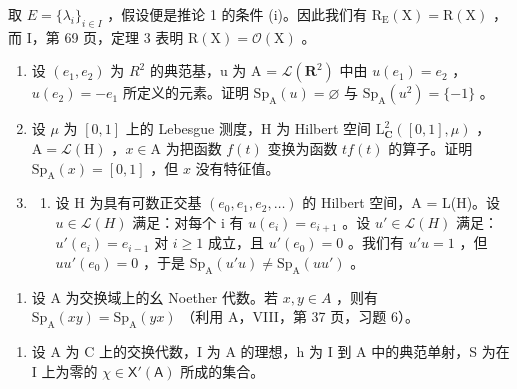 取 \(E = \{\lambda_{i}\}_{i \in I}\) ，假设便是推论 1 的条件 (i)。因此我们有 \(\mathrm{R}_{\mathrm{E}}(\mathrm{X}) = \mathrm{R}(\mathrm{X})\) ，而 I，第 69 页，定理 3 表明 \(\mathrm{R}(\mathrm{X}) = \mathcal{O}(\mathrm{X})\) 。



\begin{enumerate}
\def\labelenumi{\arabic{enumi})}
\item
  设 \((e_{1}, e_{2})\) 为 \(R^{2}\) 的典范基，u 为 A = \(\mathcal{L}(\mathbf{R}^{2})\) 中由 \(u(e_{1}) = e_{2}\) ，\(u(e_{2}) = -e_{1}\) 所定义的元素。证明 \(\mathrm{Sp}_{\mathrm{A}}(u) = \varnothing\) 与 \(\mathrm{Sp}_{\mathrm{A}}(u^{2}) = \{-1\}\) 。
\item
  设 \(\mu\) 为 \([0,1]\) 上的 Lebesgue 测度，H 为 Hilbert 空间 \(\mathrm{L}_{\mathbf{C}}^{2}([0,1],\mu)\) ，\(\mathrm{A} = \mathcal{L}(\mathrm{H})\) ，\(x \in \mathrm{A}\) 为把函数 \(f(t)\) 变换为函数 \(tf(t)\) 的算子。证明 \(\mathrm{Sp}_{\mathrm{A}}(x) = [0,1]\) ，但 \(x\) 没有特征值。
\item
  \begin{enumerate}
  \def\labelenumii{\alph{enumii})}
  \tightlist
  \item
    设 H 为具有可数正交基 \((e_{0}, e_{1}, e_{2}, \ldots)\) 的 Hilbert 空间，A = L(H)。设 \(u \in \mathcal{L}(H)\) 满足：对每个 i 有 \(u(e_{i}) = e_{i+1}\) 。设 \(u' \in \mathcal{L}(H)\) 满足：\(u'(e_{i}) = e_{i-1}\) 对 \(i \geqslant 1\) 成立，且 \(u'(e_{0}) = 0\) 。我们有 \(u'u = 1\) ，但 \(uu'(e_{0}) = 0\) ，于是 \(\mathrm{Sp}_{\mathrm{A}}(u'u) \neq \mathrm{Sp}_{\mathrm{A}}(uu')\) 。
  \end{enumerate}
\end{enumerate}

\begin{enumerate}
\def\labelenumi{\alph{enumi})}
\setcounter{enumi}{1}
\tightlist
\item
  设 A 为交换域上的幺 Noether 代数。若 \(x, y \in A\) ，则有 \(\mathrm{Sp}_{\mathrm{A}}(xy) = \mathrm{Sp}_{\mathrm{A}}(yx)\) （利用 A，VIII，第 37 页，习题 6）。
\end{enumerate}

\begin{enumerate}
\def\labelenumi{\arabic{enumi})}
\setcounter{enumi}{3}
\tightlist
\item
  设 A 为 C 上的交换代数，I 为 A 的理想，h 为 I 到 A 中的典范单射，S 为在 I 上为零的 \(\chi \in \mathsf{X}'(\mathsf{A})\) 所成的集合。
\end{enumerate}


